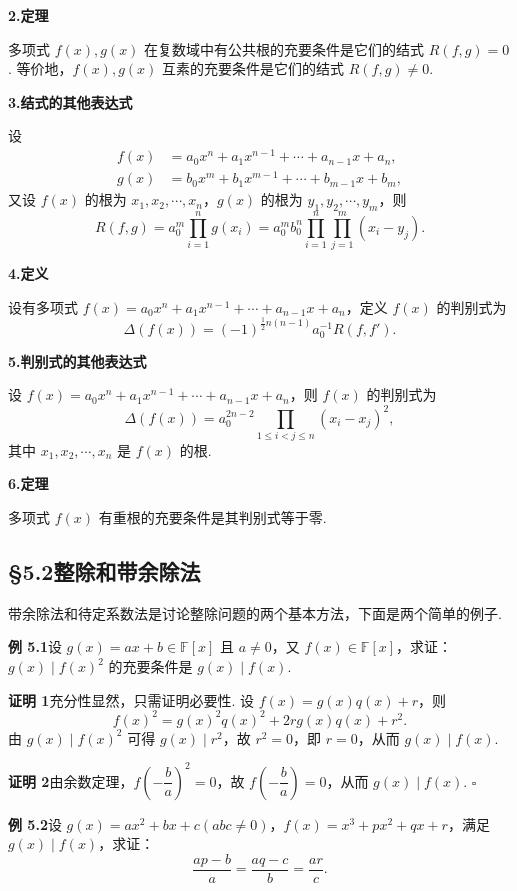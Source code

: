 \documentclass[UTF8, 12pt, fontset=fandol, oneside]{ctexart}
\begin{document}
\noindent\textbf{2.\quad 定理}

多项式 $f(x),g(x)$ 在复数域中有公共根的充要条件是它们的结式 $R(f,g)=0$. 等价地，$f(x),g(x)$ 互素的充要条件是它们的结式 $R(f,g)\ne0$.

\noindent\textbf{3.\quad 结式的其他表达式}

设
\[
\begin{aligned}
f(x)&=a_0x^n+a_1x^{n-1}+\cdots+a_{n-1}x+a_n,\\
g(x)&=b_0x^m+b_1x^{m-1}+\cdots+b_{m-1}x+b_m,
\end{aligned}
\]
又设 $f(x)$ 的根为 $x_1,x_2,\cdots,x_n$，$g(x)$ 的根为 $y_1,y_2,\cdots,y_m$，则
\[
R(f,g)=a_0^m\prod_{i=1}^n g(x_i)
=a_0^m b_0^n\prod_{i=1}^n\prod_{j=1}^m(x_i-y_j).
\]

\noindent\textbf{4.\quad 定义}

设有多项式 $f(x)=a_0x^n+a_1x^{n-1}+\cdots+a_{n-1}x+a_n$，定义 $f(x)$ 的判别式为
\[
\Delta(f(x))=(-1)^{\frac12 n(n-1)}a_0^{-1}R(f,f').
\]

\noindent\textbf{5.\quad 判别式的其他表达式}

设 $f(x)=a_0x^n+a_1x^{n-1}+\cdots+a_{n-1}x+a_n$，则 $f(x)$ 的判别式为
\[
\Delta(f(x))=a_0^{2n-2}\prod_{1\le i<j\le n}(x_i-x_j)^2,
\]
其中 $x_1,x_2,\cdots,x_n$ 是 $f(x)$ 的根.

\noindent\textbf{6.\quad 定理}

多项式 $f(x)$ 有重根的充要条件是其判别式等于零.

\subsection*{§5.2\quad 整除和带余除法}

带余除法和待定系数法是讨论整除问题的两个基本方法，下面是两个简单的例子.

\noindent\textbf{例 5.1}\quad 设 $g(x)=ax+b\in\mathbb{F}[x]$ 且 $a\ne0$，又 $f(x)\in\mathbb{F}[x]$，求证：$g(x)\mid f(x)^2$ 的充要条件是 $g(x)\mid f(x)$.

\noindent\textbf{证明 1}\quad 充分性显然，只需证明必要性. 设 $f(x)=g(x)q(x)+r$，则
\[
f(x)^2=g(x)^2q(x)^2+2rg(x)q(x)+r^2.
\]
由 $g(x)\mid f(x)^2$ 可得 $g(x)\mid r^2$，故 $r^2=0$，即 $r=0$，从而 $g(x)\mid f(x)$.

\noindent\textbf{证明 2}\quad 由余数定理，$f\left(-\dfrac{b}{a}\right)^2=0$，故 $f\left(-\dfrac{b}{a}\right)=0$，从而 $g(x)\mid f(x)$. \hfill $\square$

\noindent\textbf{例 5.2}\quad 设 $g(x)=ax^2+bx+c(abc\ne0)$，$f(x)=x^3+px^2+qx+r$，满足 $g(x)\mid f(x)$，求证：
\[
\frac{ap-b}{a}=\frac{aq-c}{b}=\frac{ar}{c}.
\]
\end{document}
